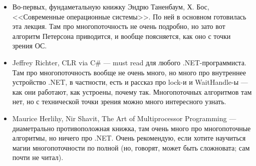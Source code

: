 \documentclass[a5paper]{article}
\begin{document}
\begin{itemize}
    \item Во-первых, фундаметальную книжку Эндрю Таненбаум, Х. Бос, <<Современные операционные системы>>. По ней в основном готовилась эта лекция. Там про многопоточность не очень подробно, но зато вот алгоритм Петерсона приводится, и вообще поясняется, как оно с точки зрения ОС.
    \item Jeffrey Richter, CLR via C\# --- must read для любого .NET-программиста. Там про многопоточность вообще не очень много, но много про внутреннее устройство .NET, в частности, есть и рассказ про lock-и и WaitHandle-ы --- как они работают, как устроены, почему так. Многопоточных алгоритмов там нет, но с технической точки зрения можно много интересного узнать.
    \item Maurice Herlihy, Nir Shavit, The Art of Multiprocessor Programming --- диаметрально противоположная книжка, там очень много про многопоточные алгоритмы, но ничего про .NET. Очень рекомендую, если хотите научиться магии многопоточности по полной (но, говорят, может быть сложновата; сам почти не читал).
\end{itemize}
\end{document}
